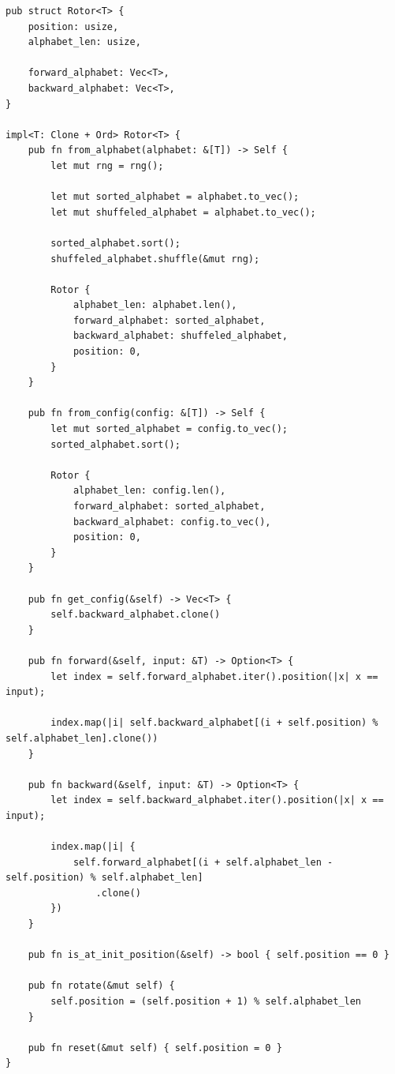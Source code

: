 \begin{center}
\captionsetup{justification=raggedright,singlelinecheck=off}
\begin{lstlisting}[label=lst:rotor,caption=реализация ротора]
pub struct Rotor<T> {
    position: usize,
    alphabet_len: usize,

    forward_alphabet: Vec<T>,
    backward_alphabet: Vec<T>,
}

impl<T: Clone + Ord> Rotor<T> {
    pub fn from_alphabet(alphabet: &[T]) -> Self {
        let mut rng = rng();

        let mut sorted_alphabet = alphabet.to_vec();
        let mut shuffeled_alphabet = alphabet.to_vec();

        sorted_alphabet.sort();
        shuffeled_alphabet.shuffle(&mut rng);

        Rotor {
            alphabet_len: alphabet.len(),
            forward_alphabet: sorted_alphabet,
            backward_alphabet: shuffeled_alphabet,
            position: 0,
        }
    }

    pub fn from_config(config: &[T]) -> Self {
        let mut sorted_alphabet = config.to_vec();
        sorted_alphabet.sort();

        Rotor {
            alphabet_len: config.len(),
            forward_alphabet: sorted_alphabet,
            backward_alphabet: config.to_vec(),
            position: 0,
        }
    }

    pub fn get_config(&self) -> Vec<T> {
        self.backward_alphabet.clone()
    }

    pub fn forward(&self, input: &T) -> Option<T> {
        let index = self.forward_alphabet.iter().position(|x| x == input);

        index.map(|i| self.backward_alphabet[(i + self.position) % self.alphabet_len].clone())
    }

    pub fn backward(&self, input: &T) -> Option<T> {
        let index = self.backward_alphabet.iter().position(|x| x == input);

        index.map(|i| {
            self.forward_alphabet[(i + self.alphabet_len - self.position) % self.alphabet_len]
                .clone()
        })
    }

    pub fn is_at_init_position(&self) -> bool { self.position == 0 }

    pub fn rotate(&mut self) {
        self.position = (self.position + 1) % self.alphabet_len
    }

    pub fn reset(&mut self) { self.position = 0 }
}
\end{lstlisting}
\end{center}

